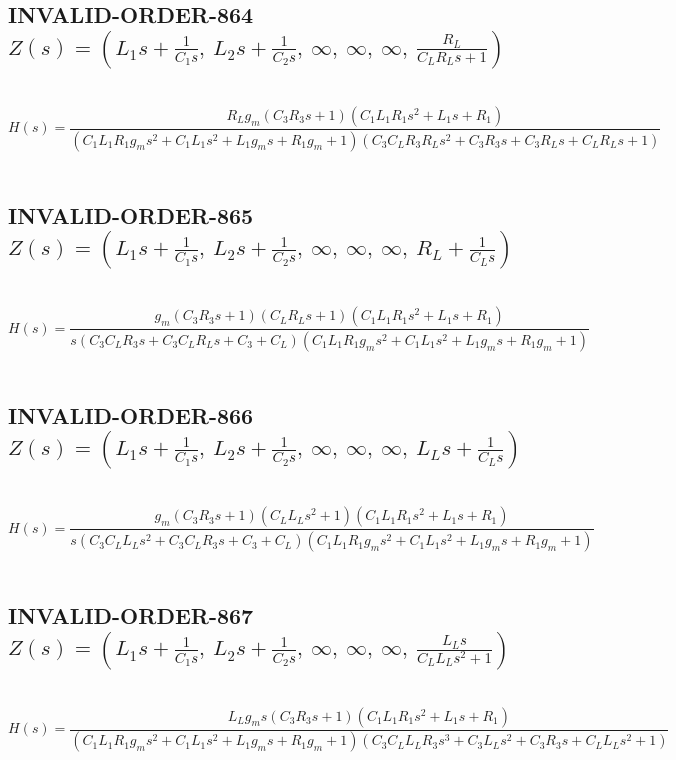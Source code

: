 \documentclass{article}
\begin{document}
\subsection{INVALID-ORDER-864 $Z(s) = \left( L_{1} s + \frac{1}{C_{1} s}, \  L_{2} s + \frac{1}{C_{2} s}, \  \infty, \  \infty, \  \infty, \  \frac{R_{L}}{C_{L} R_{L} s + 1}\right)$ } \ 
\textbf{\[H(s) = \frac{R_{L} g_{m} \left(C_{3} R_{3} s + 1\right) \left(C_{1} L_{1} R_{1} s^{2} + L_{1} s + R_{1}\right)}{\left(C_{1} L_{1} R_{1} g_{m} s^{2} + C_{1} L_{1} s^{2} + L_{1} g_{m} s + R_{1} g_{m} + 1\right) \left(C_{3} C_{L} R_{3} R_{L} s^{2} + C_{3} R_{3} s + C_{3} R_{L} s + C_{L} R_{L} s + 1\right)}\] } \ 
\subsection{INVALID-ORDER-865 $Z(s) = \left( L_{1} s + \frac{1}{C_{1} s}, \  L_{2} s + \frac{1}{C_{2} s}, \  \infty, \  \infty, \  \infty, \  R_{L} + \frac{1}{C_{L} s}\right)$ } \ 
\textbf{\[H(s) = \frac{g_{m} \left(C_{3} R_{3} s + 1\right) \left(C_{L} R_{L} s + 1\right) \left(C_{1} L_{1} R_{1} s^{2} + L_{1} s + R_{1}\right)}{s \left(C_{3} C_{L} R_{3} s + C_{3} C_{L} R_{L} s + C_{3} + C_{L}\right) \left(C_{1} L_{1} R_{1} g_{m} s^{2} + C_{1} L_{1} s^{2} + L_{1} g_{m} s + R_{1} g_{m} + 1\right)}\] } \ 
\subsection{INVALID-ORDER-866 $Z(s) = \left( L_{1} s + \frac{1}{C_{1} s}, \  L_{2} s + \frac{1}{C_{2} s}, \  \infty, \  \infty, \  \infty, \  L_{L} s + \frac{1}{C_{L} s}\right)$ } \ 
\textbf{\[H(s) = \frac{g_{m} \left(C_{3} R_{3} s + 1\right) \left(C_{L} L_{L} s^{2} + 1\right) \left(C_{1} L_{1} R_{1} s^{2} + L_{1} s + R_{1}\right)}{s \left(C_{3} C_{L} L_{L} s^{2} + C_{3} C_{L} R_{3} s + C_{3} + C_{L}\right) \left(C_{1} L_{1} R_{1} g_{m} s^{2} + C_{1} L_{1} s^{2} + L_{1} g_{m} s + R_{1} g_{m} + 1\right)}\] } \ 
\subsection{INVALID-ORDER-867 $Z(s) = \left( L_{1} s + \frac{1}{C_{1} s}, \  L_{2} s + \frac{1}{C_{2} s}, \  \infty, \  \infty, \  \infty, \  \frac{L_{L} s}{C_{L} L_{L} s^{2} + 1}\right)$ } \ 
\textbf{\[H(s) = \frac{L_{L} g_{m} s \left(C_{3} R_{3} s + 1\right) \left(C_{1} L_{1} R_{1} s^{2} + L_{1} s + R_{1}\right)}{\left(C_{1} L_{1} R_{1} g_{m} s^{2} + C_{1} L_{1} s^{2} + L_{1} g_{m} s + R_{1} g_{m} + 1\right) \left(C_{3} C_{L} L_{L} R_{3} s^{3} + C_{3} L_{L} s^{2} + C_{3} R_{3} s + C_{L} L_{L} s^{2} + 1\right)}\] } \ 
\end{document}
